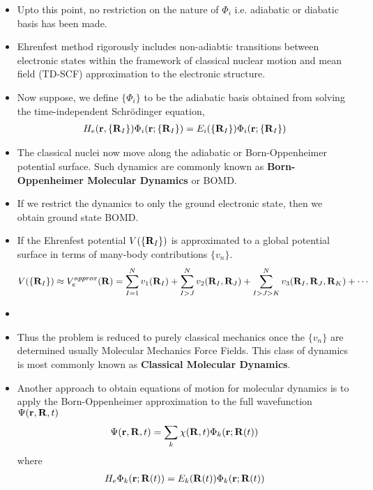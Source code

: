\documentclass[slidestop,mathserif,compress,xcolor=svgnames]{beamer}
\begin{document}
\begin{frame}[allowframebreaks]
\footnotesize{
\begin{itemize}
\item Upto this point, no restriction on the nature of $\Phi_i$ i.e. adiabatic or diabatic basis has been made. 
\item Ehrenfest method rigorously includes non-adiabtic transitions between electronic states within the framework of classical nuclear motion and mean field (TD-SCF) approximation to the electronic structure.
\item Now suppose, we define $\{\Phi_i\}$ to be the adiabatic basis obtained from solving the time-independent Schr\"{o}dinger equation,
\begin{align*}
H_e({\bf r},\{{\bf R}_I\})\Phi_i({\bf r};\{{\bf R}_I\}) = E_i(\{{\bf R}_I\})\Phi_i({\bf r};\{{\bf R}_I\})
\end{align*}
\item The classical nuclei now move along the adiabatic or Born-Oppenheimer potential surface. Such dynamics are commonly known as \textbf{Born-Oppenheimer Molecular Dynamics} or BOMD.
\item If we restrict the dynamics to only the ground electronic state, then we obtain ground state BOMD.
\item If the Ehrenfest potential $V(\{{\bf R}_I\})$ is approximated to a global potential surface in terms of many-body contributions $\{v_n\}$.
\begin{align*}
V(\{{\bf R}_I\}) \approx V^{approx}_e({\bf R}) = \sum^{N}_{I=1}v_1({\bf R}_I) + \sum^N_{I>J}v_2({\bf R}_I,{\bf R}_J) +\sum^N_{I>J>K}v_3({\bf R}_I,{\bf R}_J,{\bf R}_K) + \cdots
\end{align*}
\item[] 
\item Thus the problem is reduced to purely classical mechanics once the $\{v_n\}$ are determined usually Molecular Mechanics Force Fields. This class of dynamics is most commonly known as {\bf Classical Molecular Dynamics}.
\item Another approach to obtain equations of motion for  molecular dynamics is to apply the Born-Oppenheimer approximation to the full wavefunction $\Psi({\bf r},{\bf R},t)$
\begin{align*}
\Psi({\bf r},{\bf R},t) = \sum_k \chi({\bf R},t)\Phi_k({\bf r};{\bf R}(t))
\end{align*}
where
\begin{align*}
H_e\Phi_k({\bf r};{\bf R}(t)) = E_k({\bf R}(t))\Phi_k({\bf r};{\bf R}(t))

\end{align*}
\end{itemize}}
\end{frame}
\end{document}
